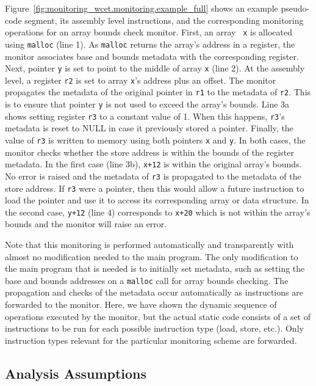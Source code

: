 Figure~\ref{fig:monitoring_wcet.monitoring.example_full} shows an example
pseudo-code segment, its assembly level instructions, and the corresponding
monitoring operations for an array bounds check monitor.  First, an array {\tt
x} is allocated using {\tt malloc} (line 1).  As {\tt malloc} returns the
array's address in a register, the monitor associates base and bounds metadata
with the corresponding register.  Next, pointer {\tt y} is set to point to the
middle of array {\tt x} (line 2).  At the assembly level, a register {\tt r2}
is set to array {\tt x}'s address plus an offset.  The monitor propagates the
metadata of the original pointer in {\tt r1} to the metadata of {\tt r2}. This
is to ensure that pointer {\tt y} is not used to exceed the array's bounds.
Line 3a shows setting register {\tt r3} to a constant value of 1.  When this
happens, {\tt r3}'s metadata is reset to NULL in case it previously stored a
pointer.  Finally, the value of {\tt r3} is written to memory using both
pointers {\tt x} and {\tt y}.  In both cases, the monitor checks whether the
store address is within the bounds of the register metadata. In the first case
(line 3b), {\tt x+12} is within the original array's bounds. No error is raised
and the metadata of {\tt r3} is propagated to the metadata of the store
address. If {\tt r3} were a pointer, then this would allow a future instruction
to load the pointer and use it to access its corresponding array or data
structure. In the second case, {\tt y+12} (line 4) corresponds to {\tt x+20}
which is not within the array's bounds and the monitor will raise an error. 

Note that this monitoring is performed automatically and transparently with
almost no modification needed to the main program. The only modification to the
main program that is needed is to initially set metadata, such as setting the
base and bounds addresses on a {\tt malloc} call for array bounds checking.
The propagation and checks of the metadata occur automatically as instructions
are forwarded to the monitor.  Here, we have shown the dynamic sequence of
operations executed by the monitor, but the actual static code consists of a
set of instructions to be run for each possible instruction type (load, store,
etc.). Only instruction types relevant for the particular monitoring scheme are
forwarded.

\subsection{Analysis Assumptions}

